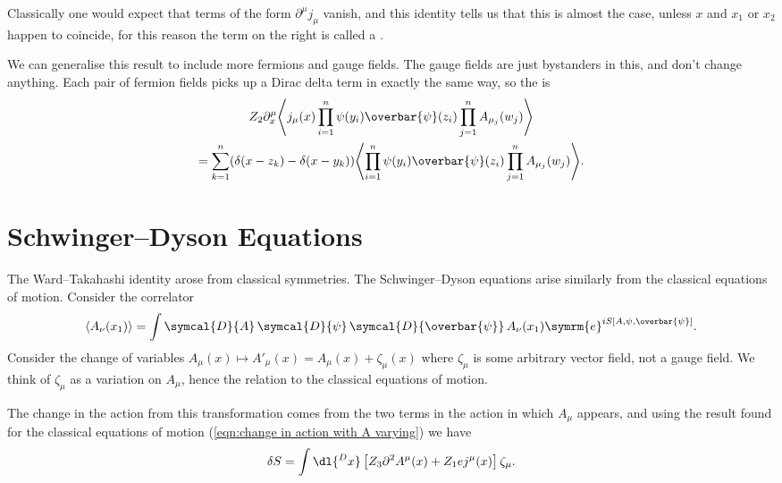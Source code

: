 \documentclass[fleqn]{NotesClass}
\newcommand{\e}{\symrm{e}}
\newcommand{\diracadjoint}[1]{\overbar{#1}}
\newcommand{\DL}[1]{\symcal{D}{#1}}
\newcommand{\DD}[1]{\,\symcal{D}{#1}}
\DeclarePairedDelimiter{\correlator}{\langle}{\rangle}
\newcommand{\dalembertian}{\partial^2}
\begin{document}
    Classically one would expect that terms of the form \(\partial^\mu j_\mu\) vanish, and this identity tells us that this is almost the case, unless \(x\) and \(x_1\) or \(x_2\) happen to coincide, for this reason the term on the right is called a .
    
    We can generalise this result to include more fermions and gauge fields.
    The gauge fields are just bystanders in this, and don't change anything.
    Each pair of fermion fields picks up a Dirac delta term in exactly the same way, so the  is
    \begin{multline}
        Z_2 \partial_x^\mu \correlator*{j_\mu(x) \prod_{i = 1}^n \psi(y_i) \diracadjoint{\psi}(z_i) \prod_{j=1}^{n}A_{\mu_j}(w_j)}\\
        = \sum_{k = 1}^{n} (\delta(x - z_k) - \delta(x - y_k)) \correlator*{\prod_{i=1}^{n} \psi(y_i) \diracadjoint{\psi}(z_i) \prod_{j=1}^n A_{\mu_j}(w_j)}.
    \end{multline}
    
    \section{Schwinger--Dyson Equations}
    The Ward--Takahashi identity arose from classical symmetries.
    The Schwinger--Dyson equations arise similarly from the classical equations of motion.
    Consider the correlator
    \begin{equation}
        \correlator{A_\nu(x_1)} = \int \DL{A} \DD{\psi} \DD{\diracadjoint{\psi}} \, A_\nu(x_1) \e^{iS[A, \psi, \diracadjoint{\psi}]}.
    \end{equation}
    Consider the change of variables \(A_\mu(x) \mapsto A'_\mu(x) = A_\mu(x) + \zeta_\mu(x)\) where \(\zeta_\mu\) is some arbitrary vector field, not a gauge field.
    We think of \(\zeta_\mu\) as a variation on \(A_\mu\), hence the relation to the classical equations of motion.
    
    The change in the action from this transformation comes from the two terms in the action in which \(A_\mu\) appears, and using the result found for the classical equations of motion (\cref{eqn:change in action with A varying}) we have
    \begin{equation}
        \delta S = \int \dl{^Dx} \left[ Z_3 \dalembertian A^\mu(x) + Z_1 ej^\mu(x) \right]\zeta_\mu.
    \end{equation}
    
\end{document}
